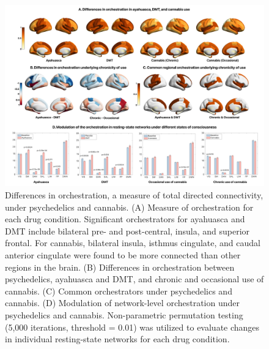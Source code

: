 \begin{figure}[h!]
    \centering
    \includegraphics[width=\textwidth]{images/Appendix_GEC.png}
    \caption[Changes in directed connectivity in the psychedelic and cannabis states]{Differences in orchestration, a measure of total directed connectivity, under psychedelics and cannabis. (A) Measure of orchestration for each drug condition. Significant orchestrators for ayahuasca and DMT include bilateral pre- and post-central, insula, and superior frontal. For cannabis, bilateral insula, isthmus cingulate, and caudal anterior cingulate were found to be more connected than other regions in the brain. (B) Differences in orchestration between psychedelics, ayahuasca and DMT, and chronic and occasional use of cannabis. (C) Common orchestrators under psychedelics and cannabis. (D) Modulation of network-level orchestration under psychedelics and cannabis. Non-parametric permutation testing (5,000 iterations, threshold = 0.01) was utilized to evaluate changes in individual resting-state networks for each drug condition.}
    \label{fig:gecrender}
\end{figure}
